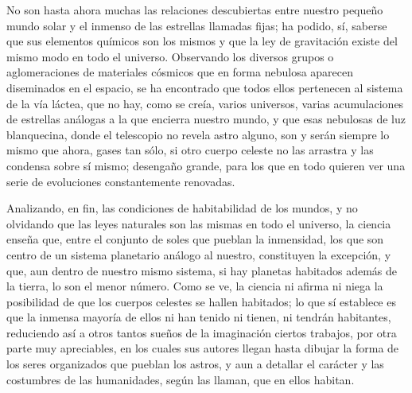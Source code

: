 \documentclass[a4paper, 12pt]{article}
\begin{document}
No son hasta ahora muchas las relaciones descubiertas entre nuestro pequeño mundo solar y el inmenso de las estrellas llamadas fijas; ha podido, sí, saberse que sus elementos químicos son los mismos y que la ley de gravitación existe del mismo modo en todo el universo. Observando los diversos grupos o aglomeraciones de materiales cósmicos que en forma nebulosa aparecen diseminados en el espacio, se ha encontrado que todos ellos pertenecen al sistema de la vía láctea, que no hay, como se creía, varios universos, varias acumulaciones de estrellas análogas a la que encierra nuestro mundo, y que esas nebulosas de luz blanquecina, donde el telescopio no revela astro alguno, son y serán siempre lo mismo que ahora, gases tan sólo, si otro cuerpo celeste no las arrastra y las condensa sobre sí mismo; desengaño grande, para los que en todo quieren ver una serie de evoluciones constantemente renovadas.

Analizando, en fin, las condiciones de habitabilidad de los mundos, y no olvidando que las leyes naturales son las mismas en todo el universo, la ciencia enseña que, entre el conjunto de soles que pueblan la inmensidad, los que son centro de un sistema planetario análogo al nuestro, constituyen la excepción, y que, aun dentro de nuestro mismo sistema, si hay planetas habitados además de la tierra, lo son el menor número. Como se ve, la ciencia ni afirma ni niega la posibilidad de que los cuerpos celestes se hallen habitados; lo que sí establece es que la inmensa mayoría de ellos ni han tenido ni tienen, ni tendrán habitantes, reduciendo así a otros tantos sueños de la imaginación ciertos trabajos, por otra parte muy apreciables, en los cuales sus autores llegan hasta dibujar la forma de los seres organizados que pueblan los astros, y aun a detallar el carácter y las costumbres de las humanidades, según las llaman, que en ellos habitan.
\end{document}
